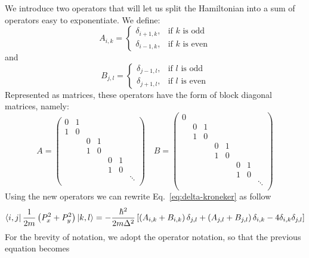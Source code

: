 We introduce two operators that will let us split the Hamiltonian into a sum of operators easy to exponentiate. We define:
\begin{equation}
A_{i,k} = \begin{cases} \delta_{i+1,k}, & \mbox{if } k\mbox{ is odd} \\ \delta_{i-1,k}, & \mbox{if } k\mbox{ is even} \end{cases}
\end{equation}
and
\begin{equation} 
B_{j,l} = \begin{cases} \delta_{j-1,l}, & \mbox{if } l\mbox{ is odd} \\ \delta_{j+1,l}, & \mbox{if } l\mbox{ is even} \end{cases}
\end{equation}
Represented as matrices, these operators have the form of block diagonal matrices, namely:
\begin{equation}
A = \begin{pmatrix}
0 & 1 \\
1 & 0 \\
 & & 0 & 1 \\
 & & 1 & 0 \\
 & & & & 0 & 1 \\
 & & & & 1 & 0 \\
 & & & &  & & \ddots \\
\end{pmatrix}
\quad B = \begin{pmatrix}
0 \\
& 0 & 1 \\
& 1 & 0 \\
& & & 0 & 1 \\
& & & 1 & 0 \\
& & & & & 0 & 1 \\
& & & & & 1 & 0 \\
& & & & &  & & \ddots \\
\end{pmatrix}
\end{equation}
Using the new operators we can rewrite Eq.~\eqref{eq:delta-kroneker} as follow
\begin{equation}
\bra{i,j} \frac{1}{2m} \left( P_x^2 + P_y^2 \right) \ket{k,l} = -\frac{\hbar^2}{2m\Delta^2} \left[ \left( A_{i,k} + B_{i,k} \right) \delta_{j,l} + \left( A_{j,l} + B_{j,l} \right) \delta_{i,k} - 4 \delta_{i,k} \delta_{j,l} \right]
\end{equation}
For the brevity of notation, we adopt the operator notation, so that the previous equation becomes
